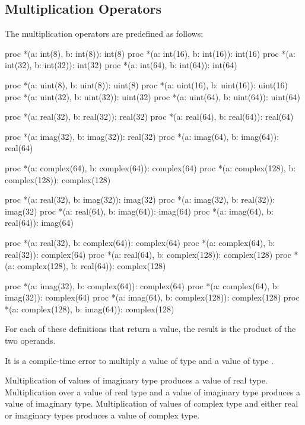 \pagebreak
\subsection{Multiplication Operators}
\label{Multiplication_Operators}

The multiplication operators are predefined as follows:
\begin{chapel}
proc *(a: int(8), b: int(8)): int(8)
proc *(a: int(16), b: int(16)): int(16)
proc *(a: int(32), b: int(32)): int(32)
proc *(a: int(64), b: int(64)): int(64)

proc *(a: uint(8), b: uint(8)): uint(8)
proc *(a: uint(16), b: uint(16)): uint(16)
proc *(a: uint(32), b: uint(32)): uint(32)
proc *(a: uint(64), b: uint(64)): uint(64)

proc *(a: real(32), b: real(32)): real(32)
proc *(a: real(64), b: real(64)): real(64)

proc *(a: imag(32), b: imag(32)): real(32)
proc *(a: imag(64), b: imag(64)): real(64)

proc *(a: complex(64), b: complex(64)): complex(64)
proc *(a: complex(128), b: complex(128)): complex(128)

proc *(a: real(32), b: imag(32)): imag(32)
proc *(a: imag(32), b: real(32)): imag(32)
proc *(a: real(64), b: imag(64)): imag(64)
proc *(a: imag(64), b: real(64)): imag(64)

proc *(a: real(32), b: complex(64)): complex(64)
proc *(a: complex(64), b: real(32)): complex(64)
proc *(a: real(64), b: complex(128)): complex(128)
proc *(a: complex(128), b: real(64)): complex(128)

proc *(a: imag(32), b: complex(64)): complex(64)
proc *(a: complex(64), b: imag(32)): complex(64)
proc *(a: imag(64), b: complex(128)): complex(128)
proc *(a: complex(128), b: imag(64)): complex(128)
\end{chapel}
For each of these definitions that return a value, the result is the
product of the two operands.

It is a compile-time error to multiply a value of type  and
a value of type .

Multiplication of values of imaginary type produces a value of real
type.  Multiplication over a value of real type and a value of
imaginary type produces a value of imaginary type.  Multiplication of
values of complex type and either real or imaginary types produces a
value of complex type.

